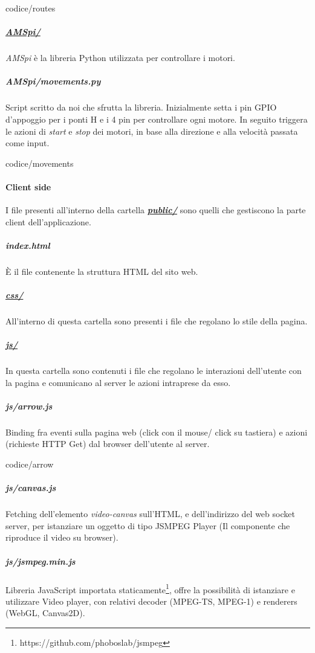 \documentclass[11pt]{article}
\begin{document}
\begin{lstinputlisting}[caption={routes.js},basicstyle=\tiny]{codice/routes}
\end{lstinputlisting}
\subparagraph{\underline{AMSpi/}}
\textit{AMSpi} è la libreria Python utilizzata per controllare i motori. 
\subparagraph{AMSpi/movements.py}
Script scritto da noi che sfrutta la libreria. Inizialmente setta i pin GPIO d'appoggio per i ponti H e i 4 pin per controllare ogni motore. In seguito triggera le azioni di \textit{start} e \textit{stop} dei motori, in base alla direzione e alla velocità passata come input.
\begin{lstinputlisting}[caption={AMSpy/movements.py},basicstyle=\tiny]{codice/movements}
\end{lstinputlisting}
\paragraph{Client side}
I file presenti all'interno della cartella \underline{\textbf{\textit{public/}}} sono quelli che gestiscono la parte client dell'applicazione.\\
\subparagraph{index.html} 
È il file contenente la struttura HTML del sito web.
\subparagraph{\underline{css/}}
All'interno di questa cartella sono presenti i file che regolano lo stile della pagina.
\subparagraph{\underline{js/}}
In questa cartella sono contenuti i file che regolano le interazioni dell'utente con la pagina e comunicano al server le azioni intraprese da esso.
\subparagraph{js/arrow.js}
Binding fra eventi sulla pagina web (click con il mouse/ click su tastiera) e azioni (richieste HTTP Get) dal browser dell'utente al server.
\begin{lstinputlisting}[caption={js/arrow.js},basicstyle=\tiny]{codice/arrow}
\end{lstinputlisting}
\subparagraph{js/canvas.js}
Fetching dell'elemento \textit{video-canvas} sull'HTML, e dell'indirizzo del web socket server, per istanziare un oggetto di tipo JSMPEG Player (Il componente che riproduce il video su browser).
\subparagraph{js/jsmpeg.min.js}
Libreria JavaScript importata staticamente\footnote{https://github.com/phoboslab/jsmpeg}, offre la possibilità di istanziare e utilizzare Video player, con relativi decoder (MPEG-TS, MPEG-1)  e renderers (WebGL, Canvas2D).
\end{document}
